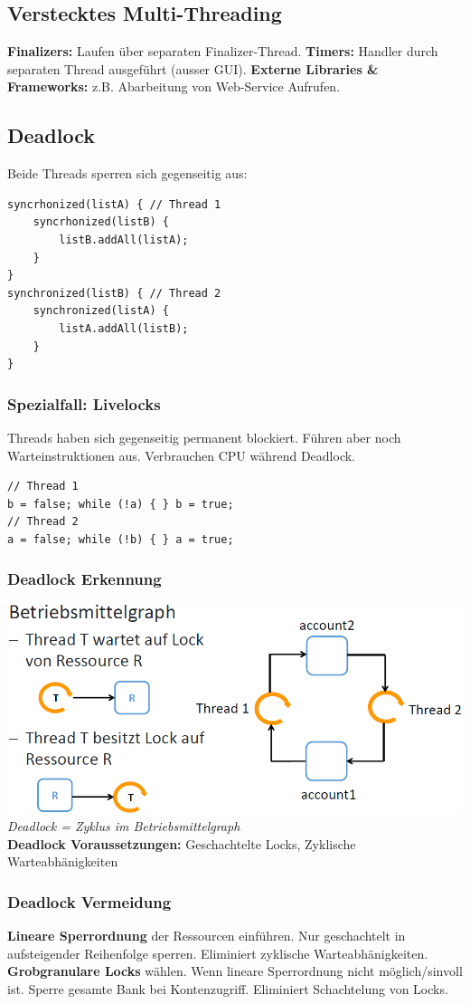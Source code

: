 \subsection{Verstecktes Multi-Threading}
\textbf{Finalizers:} Laufen über separaten Finalizer-Thread.
\textbf{Timers:} Handler durch separaten Thread ausgeführt (ausser GUI).
\textbf{Externe Libraries \& Frameworks:} z.B. Abarbeitung von Web-Service Aufrufen.

\subsection{Deadlock}
Beide Threads sperren sich gegenseitig aus:
\begin{lstlisting}
syncrhonized(listA) { // Thread 1
    syncrhonized(listB) {
        listB.addAll(listA);
    }
}
synchronized(listB) { // Thread 2
    synchronized(listA) {
        listA.addAll(listB);
    }
}
\end{lstlisting}

\subsubsection{Spezialfall: Livelocks}
Threads haben sich gegenseitig permanent blockiert. Führen aber noch Warteinstruktionen aus.
Verbrauchen CPU während Deadlock.
\begin{lstlisting}
// Thread 1
b = false; while (!a) { } b = true;
// Thread 2
a = false; while (!b) { } a = true;
\end{lstlisting}

\subsubsection{Deadlock Erkennung}
\includegraphics[width=0.7\linewidth]{img/betriebsmittelgraph.png}\\
\textit{Deadlock = Zyklus im Betriebsmittelgraph}\\ 
\textbf{Deadlock Voraussetzungen:} Geschachtelte Locks, Zyklische Warteabhänigkeiten

\subsubsection{Deadlock Vermeidung}
\textbf{Lineare Sperrordnung} der Ressourcen einführen. 
Nur geschachtelt in aufsteigender Reihenfolge sperren. 
Eliminiert zyklische Warteabhänigkeiten.\\ 
\textbf{Grobgranulare Locks} wählen.
Wenn lineare Sperrordnung nicht möglich/sinvoll ist.
Sperre gesamte Bank bei Kontenzugriff.
Eliminiert Schachtelung von Locks.


